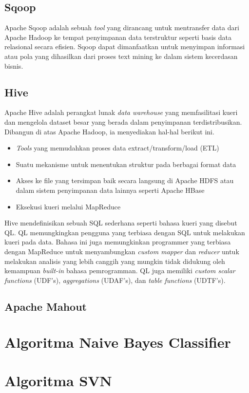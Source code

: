 \subsection{Sqoop}
\label{sec:sqoop}
Apache Sqoop adalah sebuah \textit{tool} yang dirancang untuk mentransfer data dari Apache Hadoop ke tempat penyimpanan data terstruktur seperti basis data relasional secara efisien. Sqoop dapat dimanfaatkan untuk menyimpan informasi atau pola yang dihasilkan dari proses text mining ke dalam sistem kecerdasan bisnis. \cite{sqoop:2015}

\subsection{Hive}
\label{sec:hive}
Apache Hive adalah perangkat lunak \textit{data warehouse} yang memfasilitasi kueri dan mengelola dataset besar yang berada dalam penyimpanan terdistribusikan. Dibangun di atas Apache Hadoop, ia menyediakan hal-hal berikut ini.\cite{hive:2015}

\begin{itemize}
	\item \textit{Tools} yang memudahkan proses data extract/transform/load (ETL)
	\item Suatu mekanisme untuk menentukan struktur pada berbagai format data
	\item Akses ke file yang tersimpan baik secara langsung di Apache HDFS atau dalam sistem penyimpanan data lainnya seperti Apache HBase
	\item Eksekusi kueri melalui MapReduce
\end{itemize}

Hive mendefinisikan sebuah SQL sederhana seperti bahasa kueri yang disebut QL. QL memungkingkan pengguna yang terbiasa dengan SQL untuk melakukan kueri pada data. Bahasa ini juga memungkinkan programmer yang terbiasa dengan MapReduce untuk menyambungkan \textit{custom mapper} dan \textit{reducer} untuk melakukan analisis yang lebih canggih yang mungkin tidak didukung oleh kemampuan \textit{built-in} bahasa pemrogramman. QL juga memiliki \textit{custom scalar functions} (UDF's), \textit{aggregations} (UDAF's), dan \textit{table functions} (UDTF's). \cite{sqoop:2015}

\subsection{Apache Mahout}
\label{sec:apache_mahout}

\section{Algoritma Naive Bayes Classifier}
\label{sec:algoritma_naive_bayes}

\section{Algoritma SVN}
\label{sec:algoritma_svn}